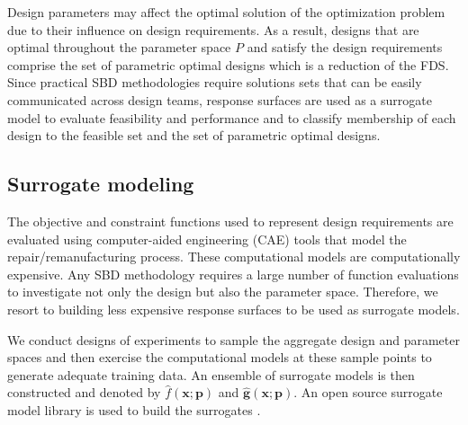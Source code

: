 Design parameters may affect the optimal solution of the optimization problem due to their influence on design requirements. As a result, designs that are optimal throughout the parameter space $\mathit{P}$ and satisfy the design requirements comprise the set of parametric optimal designs which is a reduction of the \ac{FDS}. Since practical \ac{SBD} methodolog\-ies require solutions sets that can be easily communicated across design teams, response surfaces are used as a surrogate model to evaluate feasibility and performance and to classify membership of each design to the feasible set and the set of parametric optimal designs. 

\subsection{Surrogate modeling} \label{subsec:RSM}

The objective and constraint functions used to represent design requirements are evaluated using computer-aided engineering (CAE) tools that model the repair/remanufacturing process.  
These computational models are computationally expensive. Any SBD methodology requires a large number of function evaluations to investigate not only the design but also the parameter space. Therefore, we resort to building less expensive response surfaces to be used as surrogate models.

We conduct designs of experiments to sample the aggregate design and parameter spaces and then exercise the computational models at these sample points to generate adequate training data. An ensemble of surrogate models is then constructed and denoted by $\hat{f}(\mathbf{x};{\mathbf{p}})$ and $\hat{\mathbf{g}}(\mathbf{x};{\mathbf{p}})$. An open source surrogate model library is used to build the surrogates \cite{Talgorn2018,Lophaven2002}.

